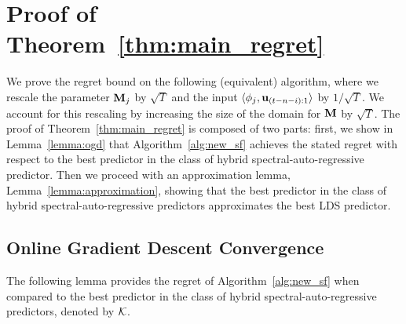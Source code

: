\section{Proof of Theorem~\ref{thm:main_regret}}
\label{appendix:main_regret}
We prove the regret bound on the following (equivalent) algorithm, where we rescale the parameter $\mathbf{M}_j$ by $\sqrt{T}$ and the input $\langle \phi_j, \mathbf u_{(t-n-i):1} \rangle$ by $1/\sqrt{T}$. We account for this rescaling by increasing the size of the domain for $\mathbf{M}$ by $\sqrt{T}$. 
The proof of Theorem~\ref{thm:main_regret} is composed of two parts: first, we show in Lemma~\ref{lemma:ogd} that Algorithm~\ref{alg:new_sf} achieves the stated regret with respect to the best predictor in the class of hybrid spectral-auto-regressive predictor. Then we proceed with an approximation lemma, Lemma~\ref{lemma:approximation}, showing that the best predictor in the class of hybrid spectral-auto-regressive predictors approximates the best LDS predictor. 


\subsection{Online Gradient Descent Convergence}
The following lemma provides the regret of Algorithm~\ref{alg:new_sf} when compared to the best predictor in the class of hybrid spectral-auto-regressive predictors, denoted by $\mathcal{K}$.




